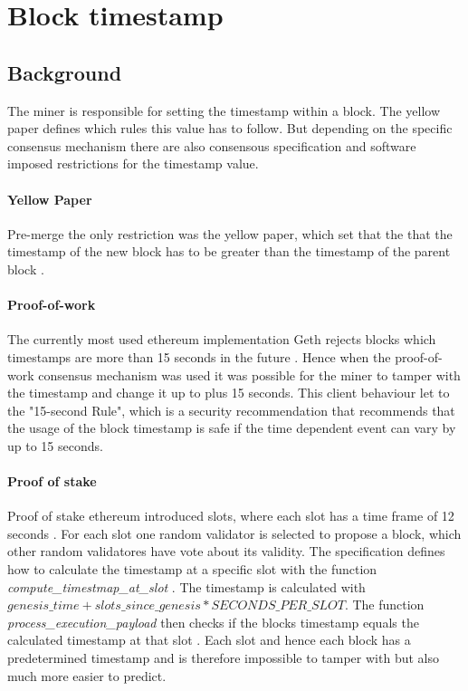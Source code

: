 \section{Block timestamp}

\subsection{Background} 
The miner is responsible for setting the timestamp within a block. The yellow
paper defines which rules this value has to follow. But depending on the
specific consensus mechanism there are also consensous specification and
software imposed restrictions for the timestamp value. 

\paragraph{Yellow Paper}
Pre-merge the only restriction was the yellow paper, which set that the that
the timestamp of the new block has to be greater than the timestamp of the
parent block \cite{ethyellowpaper2023}.

\paragraph{Proof-of-work}
The currently most used ethereum implementation Geth rejects blocks which
timestamps are more than 15 seconds in the future
\cite{go-ethereum-15-sek-limit}. Hence when the proof-of-work consensus
mechanism was used it was possible for the miner to tamper with the timestamp
and change it up to plus 15 seconds. This client behaviour let to the
"15-second Rule", which is a security recommendation that recommends that the
usage of the block timestamp is safe if the time dependent event can vary by up
to 15 seconds.

\paragraph{Proof of stake}
Proof of stake ethereum introduced slots, where each slot has a time frame of
12 seconds \cite{seconds-per-slot-mainnet}\cite{seconds-per-slot-mainnet-doc}.
For each slot one random validator is selected to propose a block, which other
random validatores have vote about its validity. The specification defines
how to calculate the timestamp at a specific slot with the function
\textit{compute\_timestmap\_at\_slot} \cite{compute-timestamp-at-slot}. The
timestamp is calculated with $genesis\_time + slots\_since\_genesis *
SECONDS\_PER\_SLOT$. The function \textit{process\_execution\_payload} then
checks if the blocks timestamp equals the calculated timestamp at that slot
\cite{process-execution-payload}. Each slot and hence each block has
a predetermined timestamp and is therefore impossible to tamper with but
also much more easier to predict.

